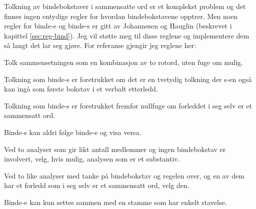 Tolkning av bindebokstaver i sammensatte ord er et komplekst problem og det finnes ingen entydige regler for hvordan bindebokstavene opptrer. Men noen regler for binde-e og binde-s er gitt av Johannesen og Hauglin \cite{johannessen1996automatic} (beskrevet i kapittel \ref{sec:reg-bind}). Jeg vil støtte meg til disse reglene og implementere dem så langt det lar seg gjøre. For referanse gjengir jeg reglene her:

\begin{enum}
	\item Tolk sammensetningen som en kombinasjon av to rotord, uten fuge om mulig.
	
		\newline
	
	\item Tolkning som binde-s er foretrukket om det er en tvetydig tolkning der s-en også kan ingå som første bokstav i et verbalt etterledd.
	
		\newline
	
	\item Tolkning som binde-s er foretrukket fremfor nullfuge om forleddet i seg selv er et sammensatt ord.
	
		\newline
	
	\item Binde-s kan aldri følge binde-e og visa versa.
		
		\newline
	
	\item Ved to analyser som gir likt antall medlemmer og ingen bindebokstav er involvert, velg, hvis mulig, analysen som er et substantiv.
		
		\newline
	
	\item Ved to like analyser med tanke på bindebokstav og regelen over, og en av dem har et forledd som i seg selv er et sammensatt ord, velg den.
		
		\newline
	
	\item Binde-e kan kun settes sammen med en stamme som har enkelt stavelse.
		

\end{enum}
